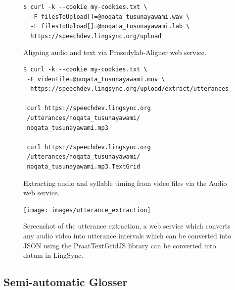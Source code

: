 \documentclass[11pt]{article}
\begin{document}
\begin{figure}[h]
\scriptsize
\begin{verbatim}
$ curl -k --cookie my-cookies.txt \
  -F filesToUpload[]=@noqata_tusunayawami.wav \
  -F filesToUpload[]=@noqata_tusunayawami.lab \
  https://speechdev.lingsync.org/upload

\end{verbatim}
\normalsize
\caption{Aligning audio and text via Prosodylab-Aligner web service.}
\label{lingsync-aligner}
\end{figure}



\begin{figure}[h]
\scriptsize
\begin{verbatim}
$ curl -k --cookie my-cookies.txt \
 -F videoFile=@noqata_tusunayawami.mov \
  https://speechdev.lingsync.org/upload/extract/utterances
  
 curl https://speechdev.lingsync.org
 /utterances/noqata_tusunayawami/
 noqata_tusunayawami.mp3 
 
 curl https://speechdev.lingsync.org
 /utterances/noqata_tusunayawami/
 noqata_tusunayawami.mp3.TextGrid
\end{verbatim}
\normalsize
\caption{Extracting audio and syllable timing from video files via the Audio web service.}
\label{lingsync-video}
\end{figure}



\begin{figure}
\begin{center}
\texttt{[image: images/utterance\_extraction]}
\caption{Screenshot of the utterance extraction, a web service which converts any audio video into utterance intervals which can be converted into JSON using the PraatTextGridJS library can be converted into datum in LingSync.}
\label{utterance_extraction_screenshot}
\end{center}
\end{figure}

\subsection{Semi-automatic Glosser}
\end{document}
